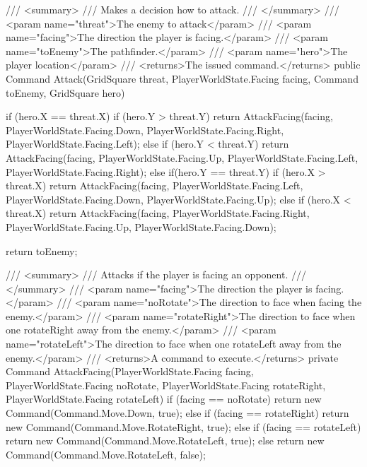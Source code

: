 \documentclass[11pt]{article}
\begin{document}
\begin{code}
{{        /// <summary>
        /// Makes a decision how to attack.
        /// </summary>
        /// <param name="threat">The enemy to attack</param>
        /// <param name="facing">The direction the player is facing.</param>
        /// <param name="toEnemy">The pathfinder.</param>
        /// <param name="hero">The player location</param>
        /// <returns>The issued command.</returns>
        public Command Attack(GridSquare threat, PlayerWorldState.Facing facing, Command toEnemy, GridSquare hero) 
        {
            if (hero.X == threat.X)
            {
                if (hero.Y > threat.Y)
                    return AttackFacing(facing, PlayerWorldState.Facing.Down, PlayerWorldState.Facing.Right, PlayerWorldState.Facing.Left);
                else if (hero.Y < threat.Y)
                    return AttackFacing(facing, PlayerWorldState.Facing.Up, PlayerWorldState.Facing.Left, PlayerWorldState.Facing.Right);
            }
            else if(hero.Y == threat.Y)
            {
                if (hero.X > threat.X)
                    return AttackFacing(facing, PlayerWorldState.Facing.Left, PlayerWorldState.Facing.Down, PlayerWorldState.Facing.Up);
                else if (hero.X < threat.X)
                    return AttackFacing(facing, PlayerWorldState.Facing.Right, PlayerWorldState.Facing.Up, PlayerWorldState.Facing.Down);
            }

            return toEnemy;
            
        }

        /// <summary>
        /// Attacks if the player is facing an opponent.
        /// </summary>
        /// <param name="facing">The direction the player is facing.</param>
        /// <param name="noRotate">The direction to face when facing the enemy.</param>
        /// <param name="rotateRight">The direction to face when one rotateRight away from the enemy.</param>
        /// <param name="rotateLeft">The direction to face when one rotateLeft away from the enemy.</param>
        /// <returns>A command to execute.</returns>
        private Command AttackFacing(PlayerWorldState.Facing facing, PlayerWorldState.Facing noRotate, PlayerWorldState.Facing rotateRight, PlayerWorldState.Facing rotateLeft)
        {
            if (facing == noRotate)
                return new Command(Command.Move.Down, true);
            else if (facing == rotateRight)
                return new Command(Command.Move.RotateRight, true);
            else if (facing == rotateLeft)
                return new Command(Command.Move.RotateLeft, true);
            else
                return new Command(Command.Move.RotateLeft, false);
        }

}}
\end{code}
\end{document}
